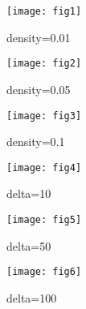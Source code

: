 \begin{figure}[p]
\texttt{[image: fig1]}
\caption{density=0.01}\label{fig:spp1}
\end{figure}
\begin{figure}[p]
\texttt{[image: fig2]}
\caption{density=0.05}\label{fig:spp2}
\end{figure}
\begin{figure}[p]
\texttt{[image: fig3]}
\caption{density=0.1}\label{fig:spp3}
\end{figure}
\begin{figure}[p]
\texttt{[image: fig4]}
\caption{delta=10}\label{fig:spp4}
\end{figure}
\begin{figure}[p]
\texttt{[image: fig5]}
\caption{delta=50}\label{fig:spp5}
\end{figure}
\begin{figure}[p]
\texttt{[image: fig6]}
\caption{delta=100}\label{fig:spp6}
\end{figure}


